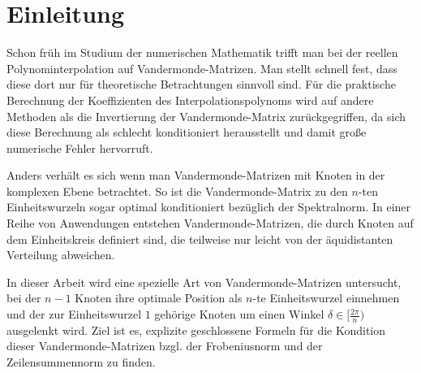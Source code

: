 \chapter{Einleitung}

Schon früh im Studium der numerischen Mathematik trifft man bei der
reellen Polynominterpolation auf Vandermonde-Matrizen.
Man stellt schnell fest, dass diese dort nur für theoretische Betrachtungen
sinnvoll sind.
Für die praktische Berechnung der Koeffizienten des Interpolationspolynoms
wird auf andere Methoden als die Invertierung der Vandermonde-Matrix
zurückgegriffen, da sich diese Berechnung als schlecht konditioniert herausstellt und damit große numerische Fehler hervorruft.

Anders verhält es sich wenn man Vandermonde-Matrizen mit Knoten in der
komplexen Ebene betrachtet.  So ist die Vandermonde-Matrix zu den $n$-ten
Einheitswurzeln sogar optimal konditioniert bezüglich der Spektralnorm.
In einer Reihe von Anwendungen entstehen Vandermonde-Matrizen, die durch Knoten
auf dem Einheitskreis definiert sind, die teilweise nur leicht von der
äquidistanten Verteilung abweichen.

In dieser Arbeit wird eine spezielle Art von Vandermonde-Matrizen untersucht,
bei der $n-1$ Knoten ihre optimale Position als $n$-te Einheitswurzel einnehmen
und der zur Einheitswurzel $1$ gehörige Knoten um einen Winkel $\delta \in
[\frac{2 \pi}{n})$ ausgelenkt wird.
Ziel ist es, explizite geschlossene Formeln für die Kondition dieser
Vandermonde-Matrizen bzgl. der Frobeniusnorm und der Zeilensummennorm zu
finden.
